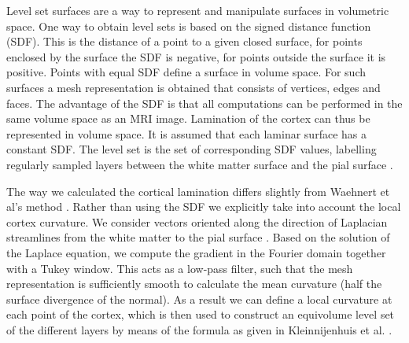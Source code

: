 Level set surfaces are a way to represent and manipulate surfaces in volumetric space. One way to obtain level sets is based on the signed distance function (SDF). This is the distance of a point to a given closed surface, for points enclosed by the surface the SDF is negative, for points outside the surface it is positive. Points with equal SDF define a surface in volume space. For such surfaces a mesh representation is obtained that consists of vertices, edges and faces. The advantage of the SDF is that all computations can be performed in the same volume space as an MRI image. Lamination of the cortex can thus be represented in volume space. It is assumed that each laminar surface has a constant SDF. The level set is the set of corresponding SDF values, labelling regularly sampled layers between the white matter surface and the pial surface \cite{Waehnert2014}.

The way we calculated the cortical lamination differs slightly from Waehnert et al's method \cite{Waehnert2014}. Rather than using the SDF we explicitly take into account the local cortex curvature. We consider vectors oriented along the direction of Laplacian streamlines from the white matter to the pial surface \cite{Leprince2015}. Based on the solution of the Laplace equation, we compute the gradient in the Fourier domain together with a Tukey window. This acts as a low-pass filter, such that the mesh representation is sufficiently smooth to calculate the mean curvature (half the surface divergence of the normal). As a result we can define a local curvature at each point of the cortex, which is then used to construct an equivolume level set of the different layers by means of the formula as given in Kleinnijenhuis et al. \cite{Kleinnijenhuis2015}.

